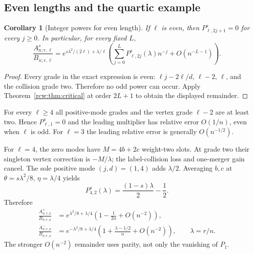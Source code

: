 \documentclass[11pt]{article}
\newtheorem{corollary}[theorem]{Corollary}
\theoremstyle{definition}\newtheorem{definition}[theorem]{Definition}
\theoremstyle{remark}\newtheorem{remark}[theorem]{Remark}
\newcommand{\A}{A^s_{n;r,\ell}}
\newcommand{\B}{B_{n;r,\ell}}
\numberwithin{equation}{section}
\begin{document}
\subsection{Even lengths and the quartic example}
\begin{corollary}[Integer powers for even length]\label{rcw:cor:parity}
If $\ell$ is even, then $P^s_{\ell,2j+1}=0$ for every $j\ge0$. In particular, for every fixed $L$,
\[
 \frac{\A}{\B}=e^{s\lambda^2/(2\ell)+\lambda/\ell}
  \left(\sum_{j=0}^L P^s_{\ell,2j}(\lambda)n^{-j}
                      +O(n^{-L-1})\right).
\]
\end{corollary}
\begin{proof}
Every grade in the exact expression is even: $\ell j-2\ell/d$, $\ell-2$, $\ell$, and the collision grade two. Therefore no odd power can occur. Apply Theorem~\ref{rcw:thm:critical} at order $2L+1$ to obtain the displayed remainder.
\end{proof}
For every $\ell\ge4$ all positive-mode grades and the vertex grade $\ell-2$ are at least two. Hence $P^s_{\ell,1}=0$ and the leading multiplier has relative error $O(1/n)$, even when $\ell$ is odd. For $\ell=3$ the leading relative error is generally $O(n^{-1/2})$.

For $\ell=4$, the zero modes have $M=4b+2c$ weight-two slots. At grade two their singleton vertex correction is $-M/\lambda$; the label-collision loss and one-merger gain cancel. The sole positive mode $(j,d)=(1,4)$ adds $\lambda/2$. Averaging $b,c$ at $\theta=s\lambda^2/8$, $\eta=\lambda/4$ yields
\[
 P^s_{4,2}(\lambda)=\frac{(1-s)\lambda}{2}-\frac12.
\]
Therefore
\begin{align*}
 \frac{A^+_{n;r,4}}{B_{n;r,4}}
 &=e^{\lambda^2/8+\lambda/4}
       \left(1-\frac1{2n}+O(n^{-2})\right),\\
 \frac{A^-_{n;r,4}}{B_{n;r,4}}
 &=e^{-\lambda^2/8+\lambda/4}
       \left(1+\frac{\lambda-1/2}{n}+O(n^{-2})\right),
 \qquad \lambda=r/n.
\end{align*}
The stronger $O(n^{-2})$ remainder uses parity, not only the vanishing of $P_1$.
\end{document}
